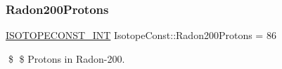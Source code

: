\subsubsection{\texorpdfstring{Radon200\+Protons}{Radon200Protons}}
{\footnotesize\ttfamily \mbox{\hyperlink{group___isotope_const-_macros_ga5f18360b3e99483a35c32d789e62621c}{I\+S\+O\+T\+O\+P\+E\+C\+O\+N\+S\+T\+\_\+\+I\+NT}} Isotope\+Const\+::\+Radon200\+Protons = 86}

\$ \$ Protons in Radon-\/200. 